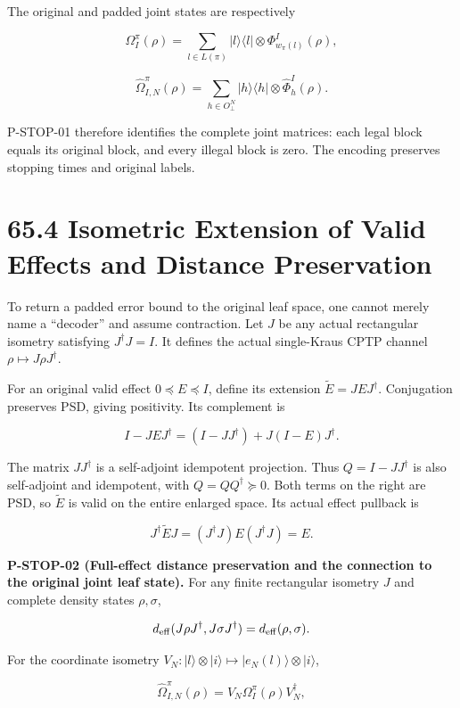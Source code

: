 \documentclass[
  11pt,
  oneside]{book}
\begin{document}
The original and padded joint states are respectively

\[
\Omega_I^\pi(\rho)
=\sum_{l\in L(\pi)}|l\rangle\langle l|\otimes
\Phi_{w_\pi(l)}^I(\rho),
\]

\[
\widehat\Omega_{I,N}^\pi(\rho)
=\sum_{h\in O_\bot^N}|h\rangle\langle h|\otimes
\widehat\Phi_h^I(\rho).
\]

P-STOP-01 therefore identifies the complete joint matrices: each legal
block equals its original block, and every illegal block is zero. The
encoding preserves stopping times and original labels.

\section{65.4 Isometric Extension of Valid Effects and Distance
Preservation}

To return a padded error bound to the original leaf space, one cannot
merely name a ``decoder'' and assume contraction. Let \(J\) be any
actual rectangular isometry satisfying \(J^\dagger J=I\). It defines the
actual single-Kraus CPTP channel \(\rho\mapsto J\rho J^\dagger\).

For an original valid effect \(0\preceq E\preceq I\), define its
extension \(\widetilde E=JEJ^\dagger\). Conjugation preserves PSD,
giving positivity. Its complement is

\[
I-JEJ^\dagger
=(I-JJ^\dagger)+J(I-E)J^\dagger.
\]

The matrix \(JJ^\dagger\) is a self-adjoint idempotent projection. Thus
\(Q=I-JJ^\dagger\) is also self-adjoint and idempotent, with
\(Q=QQ^\dagger\succeq0\). Both terms on the right are PSD, so
\(\widetilde E\) is valid on the entire enlarged space. Its actual
effect pullback is

\[
J^\dagger\widetilde E J
=(J^\dagger J)E(J^\dagger J)=E.
\]

\label{p-stop-02}{}

\textbf{P-STOP-02 (Full-effect distance preservation and the connection
to the original joint leaf state).} For any finite rectangular isometry
\(J\) and complete density states \(\rho,\sigma\),

\[
d_{\rm eff}(J\rho J^\dagger,J\sigma J^\dagger)
=d_{\rm eff}(\rho,\sigma).
\]

For the coordinate isometry
\(V_N:|l\rangle\otimes|i\rangle\mapsto|e_N(l)\rangle\otimes|i\rangle\),

\[
\widehat\Omega_{I,N}^\pi(\rho)
=V_N\Omega_I^\pi(\rho)V_N^\dagger,
\]
\end{document}
